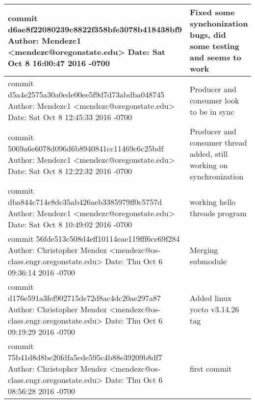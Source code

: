 \documentclass[letterpaper,10pt,titlepage]{article}
\begin{document}
\begin{tabular}{ |p{10cm}|p{3cm}| }
commit d6ae8f22080239c8822f358bfe3078b418438bf9
Author: Mendezc1 <mendezc@oregonstate.edu>
Date:   Sat Oct 8 16:00:47 2016 -0700
&
    Fixed some synchonization bugs, did some testing and seems to work\\
\hline

commit d5a4e2575a30a0ede00ee5f9d7d73abdba048745
Author: Mendezc1 <mendezc@oregonstate.edu>
Date:   Sat Oct 8 12:45:33 2016 -0700
&
    Producer and consumer look to be in sync\\
\hline

commit 5069a6e6078d096d6b8940841cc11469c6c25bdf
Author: Mendezc1 <mendezc@oregonstate.edu>
Date:   Sat Oct 8 12:22:32 2016 -0700
&
    Producer and consumer thread added, still working on synchronization\\
\hline

commit dba844c714e8dc35ab426aeb3385979ff0c5757d
Author: Mendezc1 <mendezc@oregonstate.edu>
Date:   Sat Oct 8 10:49:02 2016 -0700
&
    working hello threads program\\
\hline

commit 56fde513c508d4eff10114eae119fff6ce69f284
Author: Christopher Mendez <mendezc@os-class.engr.oregonstate.edu>
Date:   Thu Oct 6 09:36:14 2016 -0700
&
    Merging submodule\\
\hline

commit d176e591a3fef902715de72d8ac4dc20ae297a87
Author: Christopher Mendez <mendezc@os-class.engr.oregonstate.edu>
Date:   Thu Oct 6 09:19:29 2016 -0700
&
    Added linux yocto v3.14.26 tag\\
\hline

commit 75b41d8d8be20fdfa5ede595c4b88e39209b8df7
Author: Christopher Mendez <mendezc@os-class.engr.oregonstate.edu>
Date:   Thu Oct 6 08:56:28 2016 -0700
&
    first commit\\
 \hline
\end{tabular}
\end{document}
